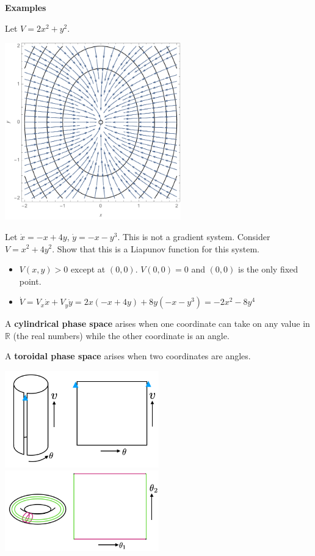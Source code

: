 \documentclass[12pt,letterpaper,noanswers]{exam}
\begin{document}
\noindent\textbf{Examples}

Let $V = 2x^2 + y^2$.  

\includegraphics[width=3in]{img/C15gradient.pdf}

Let $\dot x = -x + 4y$, $\dot y = -x-y^3$.  This is not a gradient system.  Consider $V = x^2 + 4y^2$.  Show that this is a Liapunov function for this system.

\begin{itemize}
    \item $V(x,y)>0$ except at $(0,0)$.  $V(0,0) = 0$ and $(0,0)$ is the only fixed point.
    \item $\dot V = V_x \dot x + V_y\dot y = 2x(-x+4y) + 8y(-x-y^3) = -2x^2 -8y^4$
\end{itemize}


\begin{tcolorbox}
A \textbf{cylindrical phase space} arises when one coordinate can take on any value in $\mathbb{R}$ (the real numbers) while the other coordinate is an angle.

A \textbf{toroidal phase space} arises when two coordinates are angles.
\end{tcolorbox}

\includegraphics[width=0.5\textwidth]{img/191004p1.png}
\includegraphics[width=0.5\textwidth]{img/191004p2.png}
\end{document}
